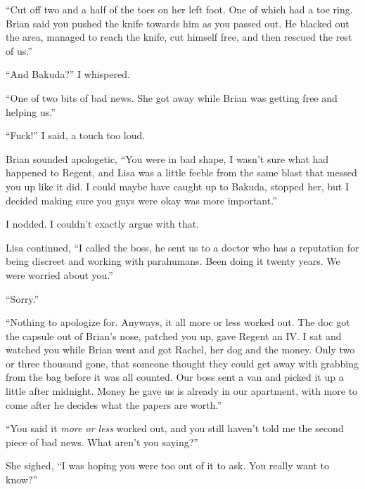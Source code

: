 ``Cut off two and a half of the toes on her left foot.  One of which had a toe ring.  Brian said you pushed the knife towards him as you passed out.  He blacked out the area, managed to reach the knife, cut himself free, and then rescued the rest of us.''



``And Bakuda?''  I whispered.



``One of two bits of bad news.  She got away while Brian was getting free and helping us.''



``Fuck!'' I said, a touch too loud.



Brian sounded apologetic, ``You were in bad shape, I wasn't sure what had happened to Regent, and Lisa was a little feeble from the same blast that messed you up like it did.  I could maybe have caught up to Bakuda, stopped her, but I decided making sure you guys were okay was more important.''



I nodded.  I couldn't exactly argue with that.



Lisa continued, ``I called the boss, he sent us to a doctor who has a reputation for being discreet and working with parahumans.  Been doing it twenty years.  We were worried about you.''



``Sorry.''



``Nothing to apologize for.  Anyways, it all more or less worked out.  The doc got the capsule out of Brian's nose, patched you up, gave Regent an IV.  I sat and watched you while Brian went and got Rachel, her dog and the money.  Only two or three thousand gone, that someone thought they could get away with grabbing from the bag before it was all counted.  Our boss sent a van and picked it up a little after midnight.  Money he gave us is already in our apartment, with more to come after he decides what the papers are worth.''



``You said it \emph{more or less} worked out, and you still haven't told me the second piece of bad news.  What aren't you saying?''



She sighed, ``I was hoping you were too out of it to ask.  You really want to know?''



